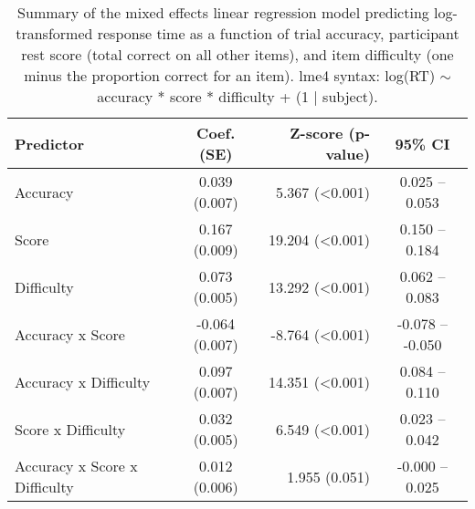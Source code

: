 \documentclass[a4paper,man,natbib]{apa6}
\begin{document}
\begin{table}[]
\centering
\begin{tabular*}{\textwidth}{lc@{\hskip 6mm}r@{\hskip 6mm}c}
\toprule
Predictor &  Coef. (SE) & Z-score (p-value) & 95\% CI  \\
\midrule
Accuracy & 0.039 (0.007) &   5.367 (<0.001) &  0.025 -- 0.053  \\
Score &  0.167 (0.009) &  19.204 (<0.001) &  0.150 -- 0.184  \\
Difficulty & 0.073 (0.005) &  13.292 (<0.001) &  0.062 -- 0.083  \\
Accuracy x Score & -0.064 (0.007) &  -8.764 (<0.001) & -0.078 -- -0.050  \\
Accuracy x Difficulty & 0.097 (0.007) &  14.351 (<0.001) &  0.084 -- 0.110  \\
Score x Difficulty &  0.032 (0.005) &   6.549 (<0.001) &  0.023 -- 0.042  \\
Accuracy x Score x Difficulty &  0.012 (0.006) & 1.955 (0.051) & -0.000 -- 0.025  \\
\bottomrule
\end{tabular*}
\caption{\label{table:1}\normalfont Summary of the mixed effects linear regression model predicting log-transformed response time as a function of trial accuracy, participant rest score (total correct on all other items), and item difficulty (one minus the proportion correct for an item). \newline lme4 syntax: log(RT) $\sim$ accuracy * score * difficulty + (1 | subject).}
\end{table}
\end{document}
